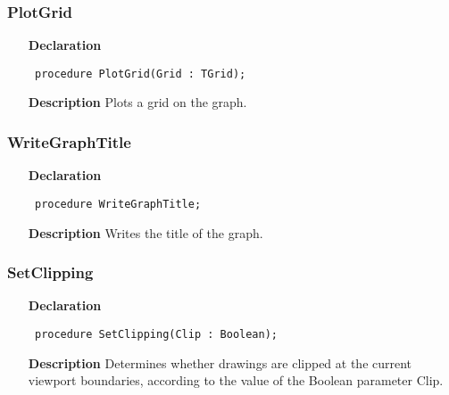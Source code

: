\documentclass[12pt,a4paper,oneside]{report}
\newcommand{\declarationitem}[1]{\textbf{#1}}
\newcommand{\descriptiontitle}[1]{\textbf{#1}}
\newcommand{\code}[1]{\texttt{#1}}
\begin{document}
\subsubsection{PlotGrid}
\label{uplot-PlotGrid}
\begin{itemize}\item[\declarationitem{Declaration}\hfill]
	\begin{flushleft}
		\code{
			procedure PlotGrid(Grid : TGrid);}
		
	\end{flushleft}
	
	\par
	\item[\descriptiontitle{Description}]
	Plots a grid on the graph.
	
\end{itemize}
\subsubsection{WriteGraphTitle}
\label{uplot-WriteGraphTitle}
\begin{itemize}\item[\declarationitem{Declaration}\hfill]
	\begin{flushleft}
		\code{
			procedure WriteGraphTitle;}
		
	\end{flushleft}
	
	\par
	\item[\descriptiontitle{Description}]
	Writes the title of the graph.
	
\end{itemize}
\subsubsection{SetClipping}
\label{uplot-SetClipping}
\begin{itemize}\item[\declarationitem{Declaration}\hfill]
	\begin{flushleft}
		\code{
			procedure SetClipping(Clip : Boolean);}
		
	\end{flushleft}
	
	\par
	\item[\descriptiontitle{Description}]
	Determines whether drawings are clipped at the current viewport boundaries, according to the value of the Boolean parameter Clip.
	
\end{itemize}
\end{document}
